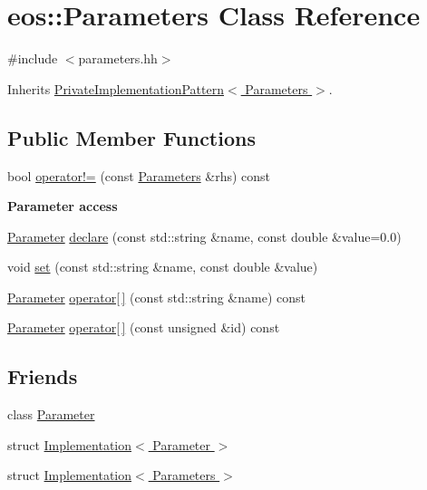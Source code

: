 \hypertarget{classeos_1_1Parameters}{
\section{eos::Parameters Class Reference}
\label{classeos_1_1Parameters}
}


{\ttfamily \#include $<$parameters.hh$>$}

Inherits \hyperlink{classeos_1_1PrivateImplementationPattern}{PrivateImplementationPattern$<$ Parameters $>$}.\subsection*{Public Member Functions}
\begin{DoxyCompactItemize}
\item 
bool \hyperlink{classeos_1_1Parameters_a95091e66b113b826bc5866c52ecdb7c1}{operator!=} (const \hyperlink{classeos_1_1Parameters}{Parameters} \&rhs) const 
\end{DoxyCompactItemize}
\begin{Indent}{\bf Parameter access}\par
{\em \label{_amgrp3534521ad23b09b81b11f604895d3593}
 }\begin{DoxyCompactItemize}
\item 
\hyperlink{classeos_1_1Parameter}{Parameter} \hyperlink{classeos_1_1Parameters_adfc224ca93af9276c55c756f6e7e2e18}{declare} (const std::string \&name, const double \&value=0.0)
\item 
void \hyperlink{classeos_1_1Parameters_ae0024a5a443069e934fda8e257e6ecd6}{set} (const std::string \&name, const double \&value)
\item 
\hyperlink{classeos_1_1Parameter}{Parameter} \hyperlink{classeos_1_1Parameters_acf41f953495892d14e4c49e248c60f43}{operator\mbox{[}$\,$\mbox{]}} (const std::string \&name) const 
\item 
\hyperlink{classeos_1_1Parameter}{Parameter} \hyperlink{classeos_1_1Parameters_ac320b54cad22e7c4eb4b3821ab409fb9}{operator\mbox{[}$\,$\mbox{]}} (const unsigned \&id) const 
\end{DoxyCompactItemize}
\end{Indent}
\subsection*{Friends}
\begin{DoxyCompactItemize}
\item 
class \hyperlink{classeos_1_1Parameters_ac1c4326186d13e3c1f20eb8f39a7b5a2}{Parameter}
\item 
struct \hyperlink{classeos_1_1Parameters_a321bcfc7467eb8a305a7e15f232efa38}{Implementation$<$ Parameter $>$}
\item 
struct \hyperlink{classeos_1_1Parameters_afdc1ae1c3b0dbac4fdf6769d5f8e1fbf}{Implementation$<$ Parameters $>$}
\end{DoxyCompactItemize}
